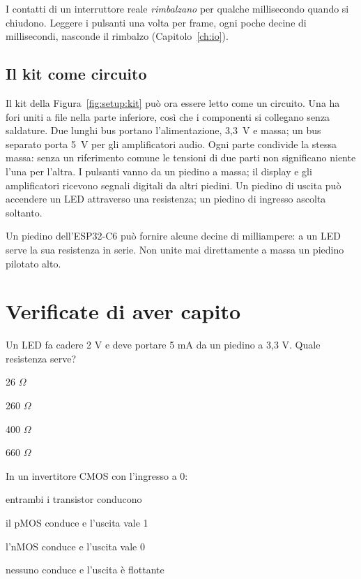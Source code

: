 I contatti di un interruttore reale \emph{rimbalzano} per qualche millisecondo
quando si chiudono. Leggere i pulsanti una volta per frame, ogni poche decine
di millisecondi, nasconde il rimbalzo (Capitolo~\ref{ch:io}).

\subsection{Il kit come circuito}

Il kit della Figura~\ref{fig:setup:kit} può ora essere letto come un circuito.
Una   ha fori uniti a file nella
parte inferiore, così che i componenti si collegano senza saldature. Due lunghi
bus portano l'alimentazione, 3,3~V e massa; un bus separato porta 5~V per gli
amplificatori audio. Ogni parte condivide la stessa massa: senza un riferimento
comune le tensioni di due parti non significano niente l'una per l'altra. I
pulsanti vanno da un piedino a massa; il display e gli amplificatori ricevono
segnali digitali da altri piedini. Un piedino di uscita può accendere un LED
attraverso una resistenza; un piedino di ingresso ascolta soltanto.

\begin{prgwarn}
Un piedino dell'ESP32-C6 può fornire alcune decine di milliampere: a un LED
serve la sua resistenza in serie. Non unite mai direttamente a massa un piedino
pilotato alto.
\end{prgwarn}





\section{Verificate di aver capito}

\begin{quiz}{Un LED fa cadere 2 V e deve portare 5 mA da un piedino a 3,3 V. Quale resistenza serve?}
\item 26 $\Omega$
\item 260 $\Omega$
\item 400 $\Omega$
\item 660 $\Omega$
\end{quiz}

\begin{quiz}{In un invertitore CMOS con l'ingresso a 0:}
\item entrambi i transistor conducono
\item il pMOS conduce e l'uscita vale 1
\item l'nMOS conduce e l'uscita vale 0
\item nessuno conduce e l'uscita è flottante
\end{quiz}

